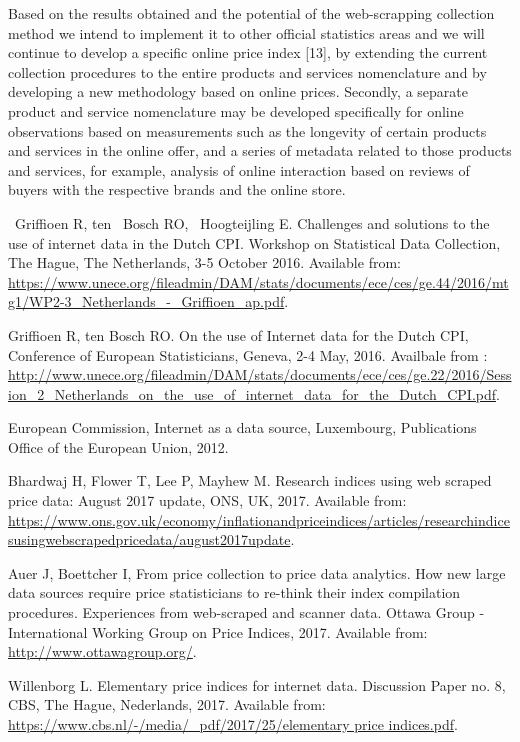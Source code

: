 \documentclass[]{article}
\begin{document}
Based on the results obtained and the potential of the web-scrapping collection method we intend to implement 
it to other official statistics areas and we will continue to develop a specific online price index [13], 
by extending the current collection procedures to the entire products and services nomenclature and by 
developing a new methodology based on online prices. Secondly, a separate product and service nomenclature may 
be developed specifically for online observations based on measurements such as the longevity of certain products 
and services in the online offer, and a series of metadata related to those products and services, for example, analysis of 
online interaction based on reviews of buyers with the respective brands and the online store.


\begin{thebibliography}{99}
~Griffioen R, ten ~Bosch RO, ~Hoogteijling E. Challenges and solutions to the use of internet data in the Dutch CPI. 
Workshop on Statistical Data Collection, The Hague, The Netherlands, 3-5 October 2016. Available from: \url{https://www.unece.org/fileadmin/DAM/stats/documents/ece/ces/ge.44/2016/mtg1/WP2-3\_Netherlands\_-\_Griffioen\_ap.pdf}.

Griffioen R, ten Bosch RO. On the use of Internet data for the Dutch CPI,
Conference of European Statisticians, Geneva, 2-4 May, 2016. Availbale from : \url{http://www.unece.org/fileadmin/DAM/stats/documents/ece/ces/ge.22/2016/Session\_2\_Netherlands\_on\_the\_use\_of\_internet\_data\_for\_the\_Dutch\_CPI.pdf}.


European Commission,
Internet as a data source,
Luxembourg, Publications Office of the European Union, 2012.

Bhardwaj H, Flower T, Lee P, Mayhew M. Research indices using web scraped price data: August 2017 update, ONS, UK, 2017. Available from:
\url{https://www.ons.gov.uk/economy/inflationandpriceindices/articles/researchindicesusingwebscrapedpricedata/august2017update}.

Auer J, Boettcher I, From price collection to price data analytics. How new large data sources require price statisticians to re-think their index compilation procedures. Experiences from web-scraped and scanner data.
Ottawa Group - International Working Group on Price Indices, 2017. Available from: \url{http://www.ottawagroup.org/}.

Willenborg L. Elementary price indices for internet data. Discussion Paper no. 8, CBS, The Hague, Nederlands, 2017. Available from:
\url{https://www.cbs.nl/-/media/\_pdf/2017/25/elementary price indices.pdf}.


\end{thebibliography}
\end{document}
